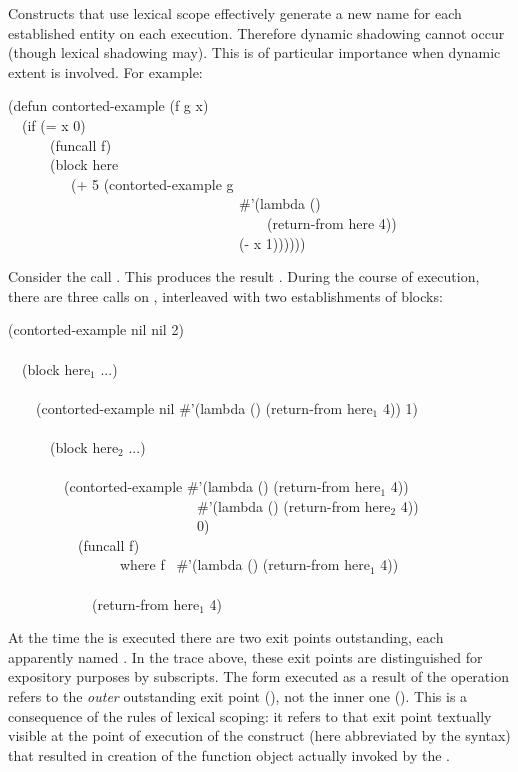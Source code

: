 Constructs that use lexical scope effectively
generate a new name for each established entity on each execution.
Therefore dynamic shadowing cannot occur (though lexical shadowing may).
This is of particular importance when dynamic extent is involved.
For example:
\begin{lisp}
(defun contorted-example (f g x) \\
~~(if (= x 0) \\
~~~~~~(funcall f) \\
~~~~~~(block here \\
~~~~~~~~~(+ 5 (contorted-example g \\
~~~~~~~~~~~~~~~~~~~~~~~~~~~~~~~~~\#'(lambda () \\
~~~~~~~~~~~~~~~~~~~~~~~~~~~~~~~~~~~~~(return-from here 4)) \\
~~~~~~~~~~~~~~~~~~~~~~~~~~~~~~~~~(- x 1))))))
\end{lisp}
Consider the call .  This produces
the result .  During the course of execution, there are three
calls on , interleaved with two establishments
of blocks:
\begin{lisp}
(contorted-example nil nil 2) \\
 \\
~~(block here\({}_1\) ...) \\
 \\
~~~~(contorted-example nil \#'(lambda () (return-from here\({}_1\) 4)) 1) \\
 \\
~~~~~~(block here\({}_2\) ...) \\
 \\
~~~~~~~~(contorted-example \#'(lambda () (return-from here\({}_1\) 4)) \\
~~~~~~~~~~~~~~~~~~~~~~~~~~~\#'(lambda () (return-from here\({}_2\) 4)) \\
~~~~~~~~~~~~~~~~~~~~~~~~~~~0) \\
~~~~~~~~~~(funcall f) \\
~~~~~~~~~~~~~~~~{\rm where} f \EV\ \#'(lambda () (return-from here\({}_1\) 4)) \\
 \\
~~~~~~~~~~~~(return-from here\({}_1\) 4)
\end{lisp}
At the time the  is executed
there are two  exit points outstanding, each apparently
named .  In the trace above, these exit points are distinguished
for expository purposes by subscripts.
The  form executed as a result of the 
operation
refers to the {\it outer} outstanding exit point
(), not the
inner one ().
This is a consequence of the rules of lexical scoping: it
refers to that exit point textually visible at the point of
execution of the 
construct (here abbreviated by the  syntax) that resulted
in creation of the function object actually invoked by the .

